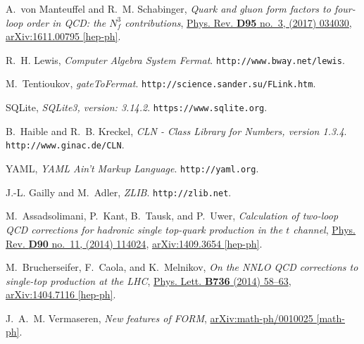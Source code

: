 \documentclass[a4paper,12pt]{scrartcl}
\begin{document}
\begin{thebibliography}{10}
A.~von Manteuffel and R.~M. Schabinger, {\em {Quark and gluon form factors to
  four-loop order in QCD: the $N_f^3$ contributions}},
  \href{http://dx.doi.org/10.1103/PhysRevD.95.034030}{Phys. Rev. {\bfseries
  D95} no.~3, (2017) 034030},
\href{http://arxiv.org/abs/1611.00795}{{\ttfamily arXiv:1611.00795 [hep-ph]}}.

R.~H. Lewis, {\em {Computer Algebra System Fermat}}.
\newblock \texttt{http://www.bway.net/lewis}.

M.~Tentioukov, {\em {gateToFermat}}.
\newblock \texttt{http://science.sander.su/FLink.htm}.

SQLite, {\em {SQLite3, version: 3.14.2}}.
\newblock \texttt{https://www.sqlite.org}.

B.~Haible and R.~B. Kreckel, {\em {CLN - Class Library for Numbers, version
  1.3.4}}.
\newblock \texttt{http://www.ginac.de/CLN}.

YAML, {\em {YAML Ain't Markup Language}}.
\newblock \texttt{http://yaml.org}.

J.-L. Gailly and M.~Adler, {\em {ZLIB}}.
\newblock \texttt{http://zlib.net}.

M.~Assadsolimani, P.~Kant, B.~Tausk, and P.~Uwer, {\em {Calculation of two-loop
  QCD corrections for hadronic single top-quark production in the $t$
  channel}}, \href{http://dx.doi.org/10.1103/PhysRevD.90.114024}{Phys. Rev.
  {\bfseries D90} no.~11, (2014) 114024},
\href{http://arxiv.org/abs/1409.3654}{{\ttfamily arXiv:1409.3654 [hep-ph]}}.

M.~Brucherseifer, F.~Caola, and K.~Melnikov, {\em {On the NNLO QCD corrections
  to single-top production at the LHC}},
  \href{http://dx.doi.org/10.1016/j.physletb.2014.06.075}{Phys. Lett.
  {\bfseries B736} (2014) 58--63},
\href{http://arxiv.org/abs/1404.7116}{{\ttfamily arXiv:1404.7116 [hep-ph]}}.

J.~A.~M. Vermaseren, {\em {New features of FORM}},
\href{http://arxiv.org/abs/math-ph/0010025}{{\ttfamily arXiv:math-ph/0010025
  [math-ph]}}.

\end{thebibliography}\endgroup
\end{document}

